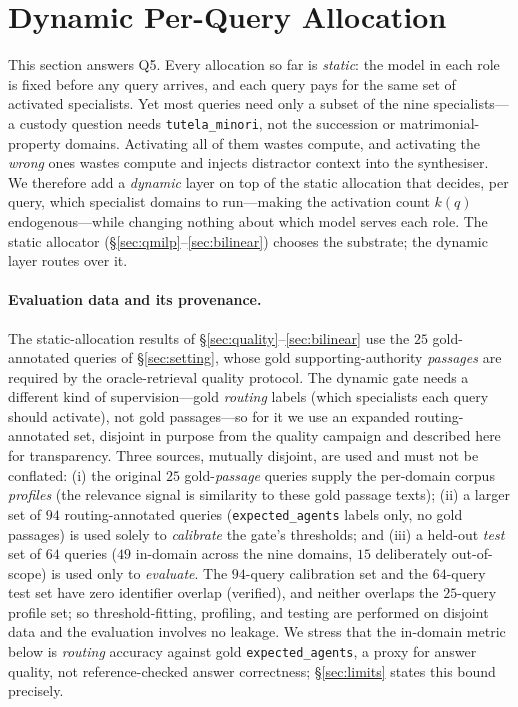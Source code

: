 \documentclass[11pt]{article}
\begin{document}
\section{Dynamic Per-Query Allocation}
\label{sec:dynamic}
This section answers Q5. Every allocation so far is \emph{static}: the model in
each role is fixed before any query arrives, and each query pays for the same set
of activated specialists. Yet most queries need only a subset of the nine
specialists---a custody question needs \texttt{tutela\_minori}, not the succession
or matrimonial-property domains. Activating all of them wastes compute, and
activating the \emph{wrong} ones wastes compute and injects distractor context into
the synthesiser. We therefore add a \emph{dynamic} layer on top of the static
allocation that decides, per query, which specialist domains to run---making the
activation count $k(q)$ endogenous---while changing nothing about which model serves
each role. The static allocator (§\ref{sec:qmilp}--\ref{sec:bilinear}) chooses the
substrate; the dynamic layer routes over it.

\paragraph{Evaluation data and its provenance.}
\label{sec:dyn-data}
The static-allocation results of §\ref{sec:quality}--\ref{sec:bilinear} use the
$25$ gold-annotated queries of §\ref{sec:setting}, whose gold supporting-authority
\emph{passages} are required by the oracle-retrieval quality protocol. The dynamic
gate needs a different kind of supervision---gold \emph{routing} labels (which
specialists each query should activate), not gold passages---so for it we use an
expanded routing-annotated set, disjoint in purpose from the quality campaign and
described here for transparency. Three sources, mutually disjoint, are used and must
not be conflated: (i) the original $25$ gold-\emph{passage} queries supply the
per-domain corpus \emph{profiles} (the relevance signal is similarity to these gold
passage texts); (ii) a larger set of $94$ routing-annotated queries (\texttt{expected\_agents}
labels only, no gold passages) is used solely to \emph{calibrate} the gate's
thresholds; and (iii) a held-out \emph{test} set of $64$ queries ($49$ in-domain
across the nine domains, $15$ deliberately out-of-scope) is used only to
\emph{evaluate}. The $94$-query calibration set and the $64$-query test set have
zero identifier overlap (verified), and neither overlaps the $25$-query
profile set; so threshold-fitting, profiling, and testing are performed on disjoint
data and the evaluation involves no leakage. We stress that the in-domain metric
below is \emph{routing} accuracy against gold \texttt{expected\_agents}, a proxy for
answer quality, not reference-checked answer correctness; §\ref{sec:limits} states
this bound precisely.
\end{document}
